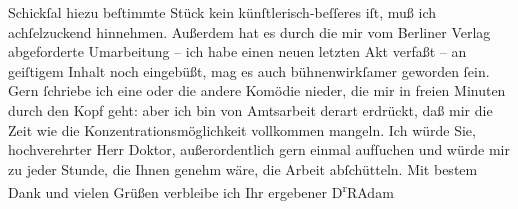 \begin{ledgroupsized}[t]{13cm}
                    Schickſal hiezu beſtimmte Stück kein künſtlerisch-beſſeres iſt, muß ich achſelzuckend hinnehmen.
                    Außerdem hat es durch die mir vom Berliner Verlag abgeforderte
                    Umarbeitung – ich habe einen neuen letzten Akt verfaßt – an geiſtigem Inhalt
                    noch eingebüßt, mag es auch bühnenwirkſamer geworden ſein.\pend
           \pstart
           Gern ſchriebe ich eine oder die andere Komödie {\pb}nieder, die mir in freien Minuten
                    durch den Kopf geht: aber ich bin von Amtsarbeit derart erdrückt, daß mir die
                    Zeit wie die Konzentrationsmöglichkeit vollkommen mangeln.\pend
           \pstart
           Ich würde Sie, hochverehrter Herr Doktor, außerordentlich gern einmal aufſuchen
                    und würde mir zu jeder Stunde, die Ihnen genehm wäre, die Arbeit
                    abſchütteln.\pend
           \pstart
           Mit bestem Dank und vielen Grüßen verbleibe ich Ihr ergebener\pend
           \pstart \spacefill\mbox{D\textsuperscript{r}RAdam}\pend{}          \endnumbering{}\end{ledgroupsized}  \newcommand{\dateiname}{L02538}\newcommand{\titel}{Robert Adam an Arthur Schnitzler, 15. 6. 1930}\newcommand{\editorInnen}{Martin Anton Müller und Gerd-Hermann Susen}
            \footnotesize
\begin{ledgroupsized}[t]{11.5cm}
\end{ledgroupsized}
         
      